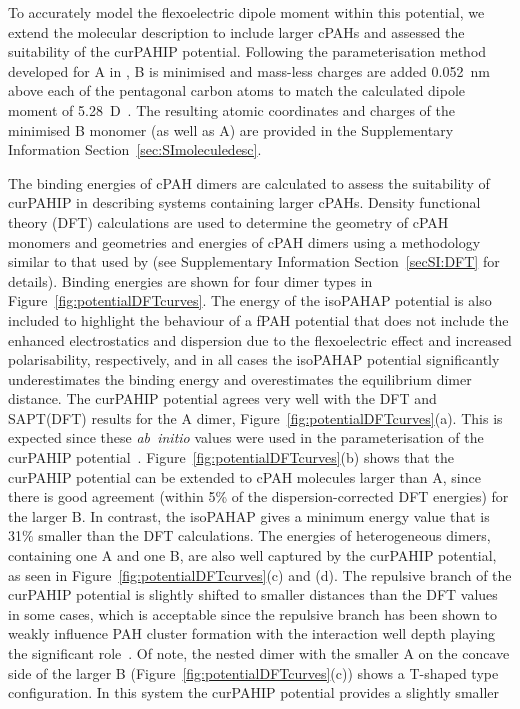 To accurately model the flexoelectric dipole moment within this potential, we extend the molecular description to include larger cPAHs and assessed the suitability of the curPAHIP potential. Following the parameterisation method developed for A in \citet{bowal2019ion}, B is minimised and mass-less charges are added 0.052~nm above each of the pentagonal carbon atoms to match the calculated dipole moment of 5.28~D~\cite{Martin2018flexo}. The resulting atomic coordinates and charges of the minimised B monomer (as well as A) are provided in the Supplementary Information Section~\ref{sec:SImoleculedesc}.

The binding energies of cPAH dimers are calculated to assess the suitability of curPAHIP in describing systems containing larger cPAHs. Density functional theory (DFT) calculations are used to determine the geometry of cPAH monomers and geometries and energies of cPAH dimers using a methodology similar to that used by \citet{Martin2018polar} (see Supplementary Information Section~\ref{secSI:DFT} for details). Binding energies are shown for four dimer types in Figure~\ref{fig:potentialDFTcurves}. The energy of the isoPAHAP potential is also included to highlight the behaviour of a fPAH potential that does not include the enhanced electrostatics and dispersion due to the flexoelectric effect and increased polarisability, respectively, and in all cases the isoPAHAP potential significantly underestimates the binding energy and overestimates the equilibrium dimer distance.
The curPAHIP potential agrees very well with the DFT and SAPT(DFT) results for the A dimer, Figure~\ref{fig:potentialDFTcurves}(a). This is expected since these \textit{ab~initio} values were used in the parameterisation of the curPAHIP potential~\cite{bowal2019ion}. 
Figure~\ref{fig:potentialDFTcurves}(b) shows that the curPAHIP potential can be extended to cPAH molecules larger than A, since there is good agreement (within 5\% of the dispersion-corrected DFT energies) for the larger B. In contrast, the isoPAHAP gives a minimum energy value that is 31\% smaller than the DFT calculations.
The energies of heterogeneous dimers, containing one A and one B, are also well captured by the curPAHIP potential, as seen in Figure~\ref{fig:potentialDFTcurves}(c) and (d). The repulsive branch of the curPAHIP potential is slightly shifted to smaller distances than the DFT values in some cases, which is acceptable since the repulsive branch has been shown to weakly influence PAH cluster formation with the interaction well depth playing the significant role~\cite{Pascazio2017}. Of note, the nested dimer with the smaller A on the concave side of the larger B (Figure~\ref{fig:potentialDFTcurves}(c)) shows a T-shaped type configuration. In this system the curPAHIP potential provides a slightly smaller %
